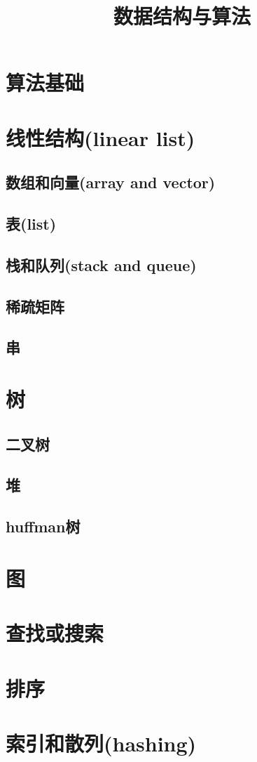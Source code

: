\documentclass{ctexart}
\begin{document}
	
\title{数据结构与算法}
\author{ }
\maketitle


\tableofcontents



\section{算法基础}

\section{线性结构(linear list)}
\subsection{数组和向量(array and vector)}
\subsection{表(list)}
\subsection{栈和队列(stack and queue)}
\subsection{稀疏矩阵}
\subsection{串}


\section{树}
\subsection{二叉树}
\subsection{堆}
\subsection{huffman树}

\section{图}

\section{查找或搜索}

\section{排序}

\section{索引和散列(hashing)}



    






	
\end{document}
